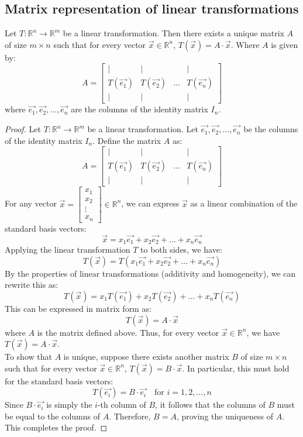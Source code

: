 \subsection{Matrix representation of linear transformations}
\begin{theorem}
    Let $T: \mathbb{R}^n \to \mathbb{R}^m$ be a linear transformation. Then there exists a unique matrix $A$ of size $m \times n$ such that for every vector $\vec{x} \in \mathbb{R}^n$, $T(\vec{x}) = A \cdot \vec{x}$. Where $A$ is given by:
    \[
        A = \begin{bmatrix} | & | && | \\ T(\vec{e_1}) & T(\vec{e_2}) & \ldots & T(\vec{e_n}) \\ | & | && | \end{bmatrix}
    \]
    where $\vec{e_1}, \vec{e_2}, \ldots, \vec{e_n}$ are the columns of the identity matrix $I_n$.
\end{theorem}
\begin{proof}
    Let $T: \mathbb{R}^n \to \mathbb{R}^m$ be a linear transformation. Let $\vec{e_1}, \vec{e_2}, \ldots, \vec{e_n}$ be the columns of the identity matrix $I_n$. Define the matrix $A$ as:
    \[
        A = \begin{bmatrix} | & | && | \\ T(\vec{e_1}) & T(\vec{e_2}) & \ldots & T(\vec{e_n}) \\ | & | && | \end{bmatrix}
    \]
    For any vector $\vec{x} = \begin{bmatrix} x_1 \\ x_2 \\ \vdots \\ x_n \end{bmatrix} \in \mathbb{R}^n$, we can express $\vec{x}$ as a linear combination of the standard basis vectors:
    \[
        \vec{x} = x_1 \vec{e_1} + x_2 \vec{e_2} + \ldots + x_n \vec{e_n}
    \]
    Applying the linear transformation $T$ to both sides, we have:
    \[
        T(\vec{x}) = T(x_1 \vec{e_1} + x_2 \vec{e_2} + \ldots + x_n \vec{e_n})
    \]
    By the properties of linear transformations (additivity and homogeneity), we can rewrite this as:
    \[
        T(\vec{x}) = x_1 T(\vec{e_1}) + x_2 T(\vec{e_2}) + \ldots + x_n T(\vec{e_n})
    \]
    This can be expressed in matrix form as:
    \[
        T(\vec{x}) = A \cdot \vec{x}
    \]
    where $A$ is the matrix defined above. Thus, for every vector $\vec{x} \in \mathbb{R}^n$, we have $T(\vec{x}) = A \cdot \vec{x}$. \\
    To show that $A$ is unique, suppose there exists another matrix $B$ of size $m \times n$ such that for every vector $\vec{x} \in \mathbb{R}^n$, $T(\vec{x}) = B \cdot \vec{x}$. In particular, this must hold for the standard basis vectors:
    \[
        T(\vec{e_i}) = B \cdot \vec{e_i} \quad \text{for } i = 1, 2, \ldots, n
    \]
    Since $B \cdot \vec{e_i}$ is simply the $i$-th column of $B$, it follows that the columns of $B$ must be equal to the columns of $A$. Therefore, $B = A$, proving the uniqueness of $A$. This completes the proof.
\end{proof}

